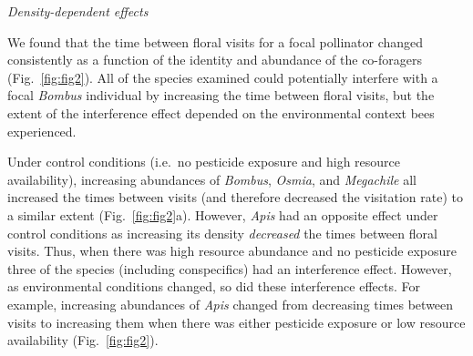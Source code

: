 \begin{refsection}
\textit{Density-dependent effects}

We found that the time between floral visits for a focal pollinator changed consistently as a function of the identity and abundance of the co-foragers (Fig.~\ref{fig:fig2}). All of the species examined could potentially interfere with a focal \textit{Bombus} individual by increasing the time between floral visits, but the extent of the interference effect depended on the environmental context bees experienced.

Under control conditions (i.e.\ no pesticide exposure and high resource availability), increasing abundances of \textit{Bombus}, \textit{Osmia}, and \textit{Megachile} all increased the times between visits (and therefore decreased the visitation rate) to a similar extent (Fig.~\ref{fig:fig2}a). However, \textit{Apis} had an opposite effect under control conditions as increasing its density \emph{decreased} the times between floral visits. Thus, when there was high resource abundance and no pesticide exposure three of the species (including conspecifics) had an interference effect. However, as environmental conditions changed, so did these interference effects. For example, increasing abundances of \textit{Apis} changed from decreasing times between visits to increasing them when there was either pesticide exposure or low resource availability (Fig.~\ref{fig:fig2}).




\end{refsection}
